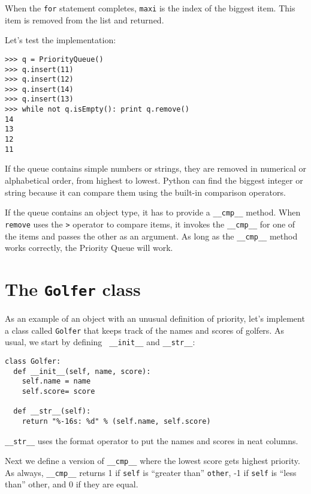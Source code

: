 
When the {\tt for} statement completes,
{\tt maxi} is the index of the biggest item.  This item
is removed from the list and returned.

Let's test the implementation:

\beforeverb
\begin{verbatim}
>>> q = PriorityQueue()
>>> q.insert(11)
>>> q.insert(12)
>>> q.insert(14)
>>> q.insert(13)
>>> while not q.isEmpty(): print q.remove()
14
13
12
11
\end{verbatim}
\afterverb
%
If the queue contains simple numbers or strings, they are
removed in numerical or alphabetical order, from highest to
lowest.  Python can find the biggest integer or string because
it can compare them using the built-in comparison operators.

If the queue contains an object type, it has to provide
a {\tt \_\_cmp\_\_} method.  When {\tt remove} uses the {\tt >}
operator to compare items, it invokes the {\tt \_\_cmp\_\_}
for one of the items and passes the other as an argument.  As
long as the {\tt \_\_cmp\_\_} method works correctly, the
Priority Queue will work.


\section{The {\tt Golfer} class}

As an example of an object with an unusual definition of priority, let's
implement a class called {\tt Golfer} that keeps track of the
names and scores of golfers.  As usual, we start by defining {\tt
\_\_init\_\_} and {\tt \_\_str\_\_}:

\beforeverb
\begin{verbatim}
class Golfer:
  def __init__(self, name, score):
    self.name = name
    self.score= score

  def __str__(self):
    return "%-16s: %d" % (self.name, self.score)
\end{verbatim}
\afterverb
%
{\tt \_\_str\_\_} uses the format operator to put the names
and scores in neat columns.


Next we define a version of {\tt \_\_cmp\_\_} where the lowest
score gets highest priority.  As always, {\tt \_\_cmp\_\_} returns
1 if {\tt self} is ``greater than'' {\tt other}, -1 if {\tt self}
is ``less than'' other, and 0 if they are equal.

